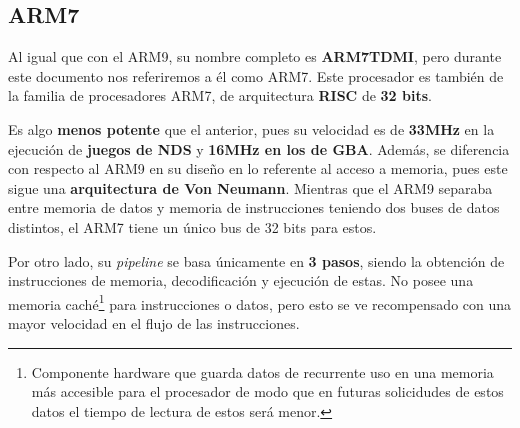 \subsection{ARM7}

Al igual que con el ARM9, su nombre completo es \textbf{ARM7TDMI}, pero durante este documento nos referiremos a él como ARM7. Este procesador es también de la familia de procesadores ARM7, de arquitectura \textbf{RISC} de \textbf{32 bits}.

\vspace{0.5cm}

Es algo \textbf{menos potente} que el anterior, pues su velocidad es de \textbf{33MHz} en la ejecución de \textbf{juegos de NDS} y \textbf{16MHz en los de GBA}. Además, se diferencia con respecto al ARM9 en su diseño en lo referente al acceso a memoria, pues este sigue una \textbf{arquitectura de Von Neumann}. Mientras que el ARM9 separaba entre memoria de datos y memoria de instrucciones teniendo dos buses de datos distintos, el ARM7 tiene un único bus de 32 bits para estos.

\vspace{0.5cm}

Por otro lado, su \textit{pipeline} se basa únicamente en \textbf{3 pasos}, siendo la obtención de instrucciones de memoria, decodificación y ejecución de estas. No posee una memoria caché\footnote{Componente hardware que guarda datos de recurrente uso en una memoria más accesible para el procesador de modo que en futuras solicidudes de estos datos el tiempo de lectura de estos será menor.} para instrucciones o datos, pero esto se ve recompensado con una mayor velocidad en el flujo de las instrucciones.

